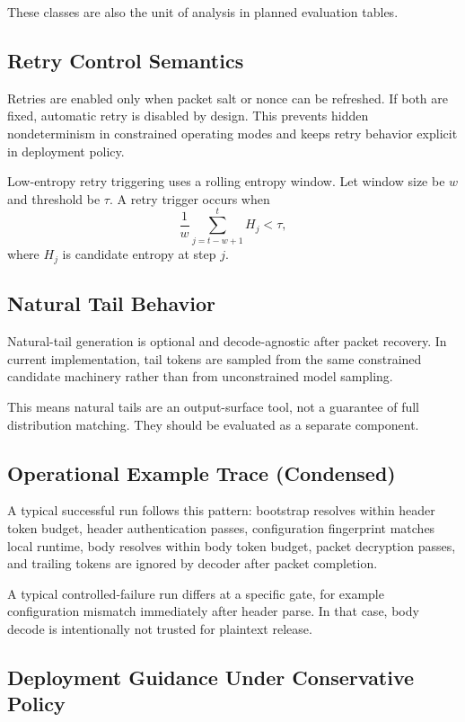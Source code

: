These classes are also the unit of analysis in planned evaluation tables.

\subsection{Retry Control Semantics}

Retries are enabled only when packet salt or nonce can be refreshed. If both are fixed, automatic retry is disabled by design. This prevents hidden nondeterminism in constrained operating modes and keeps retry behavior explicit in deployment policy.

Low-entropy retry triggering uses a rolling entropy window. Let window size be $w$ and threshold be $\tau$. A retry trigger occurs when
\begin{equation}
\frac{1}{w}\sum_{j=t-w+1}^{t} H_j < \tau,
\end{equation}
where $H_j$ is candidate entropy at step $j$.

\subsection{Natural Tail Behavior}

Natural-tail generation is optional and decode-agnostic after packet recovery. In current implementation, tail tokens are sampled from the same constrained candidate machinery rather than from unconstrained model sampling.

This means natural tails are an output-surface tool, not a guarantee of full distribution matching. They should be evaluated as a separate component.

\subsection{Operational Example Trace (Condensed)}

A typical successful run follows this pattern: bootstrap resolves within header token budget, header authentication passes, configuration fingerprint matches local runtime, body resolves within body token budget, packet decryption passes, and trailing tokens are ignored by decoder after packet completion.

A typical controlled-failure run differs at a specific gate, for example configuration mismatch immediately after header parse. In that case, body decode is intentionally not trusted for plaintext release.

\subsection{Deployment Guidance Under Conservative Policy}

